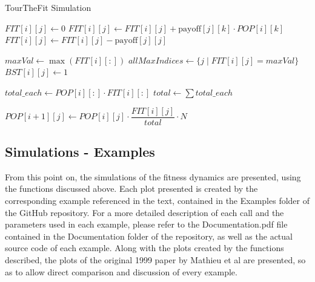 \begin{algorithm}
\caption{TourTheFit Simulation}
\begin{algorithmic}[1]
        \STATE $FIT[i][j] \gets 0$
            \STATE $FIT[i][j] \gets FIT[i][j] + \text{payoff}[j][k] \cdot POP[i][k]$
        \ENDFOR
        \STATE $FIT[i][j] \gets FIT[i][j] - \text{payoff}[j][j]$
    \ENDFOR

    \STATE $maxVal \gets \max(FIT[i][:])$
    \STATE $allMaxIndices \gets \{j \mid FIT[i][j] = maxVal\}$
        \STATE $BST[i][j] \gets 1$
    \ENDFOR

    \STATE $total\_each \gets POP[i][:] \cdot FIT[i][:]$ 
    \STATE $total \gets \sum total\_each$

        \STATE $POP[i+1][j] \gets POP[i][j] \cdot \dfrac{FIT[i][j]}{total} \cdot N$
    \ENDFOR
\ENDFOR
\end{algorithmic}
\end{algorithm}

\subsection{Simulations - Examples}
From this point on, the simulations of the fitness dynamics are presented, using the functions discussed above. Each plot presented is created by the corresponding example referenced in the text, contained in the Examples folder of the GitHub repository. For a more detailed description of each call and the parameters used in each example, please refer to the Documentation.pdf file contained in the Documentation folder of the repository, as well as the actual source code of each example. Along with the plots created by the functions described, the plots of the original 1999 paper by Mathieu et al are presented, so as to allow direct comparison and discussion of every example. 
